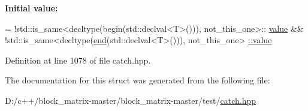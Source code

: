 {\bfseries Initial value\+:}
\begin{DoxyCode}
=
            !std::is\_same<decltype(begin(std::declval<T>())), not\_this\_one>::
      \mbox{\hyperlink{struct_catch_1_1is__range_afaec39e819c3956829cbbd00feba11be}{value}} &&
            !std::is\_same<decltype(\mbox{\hyperlink{namespace_catch_a71fef6a57614eb2d9751f8586ff6de6a}{end}}(std::declval<T>())), not\_this\_one>
      \mbox{\hyperlink{struct_catch_1_1is__range_afaec39e819c3956829cbbd00feba11be}{::value}}
\end{DoxyCode}


Definition at line 1078 of file catch.\+hpp.



The documentation for this struct was generated from the following file\+:\begin{DoxyCompactItemize}
\item 
D\+:/c++/block\+\_\+matrix-\/master/block\+\_\+matrix-\/master/test/\mbox{\hyperlink{catch_8hpp}{catch.\+hpp}}\end{DoxyCompactItemize}
